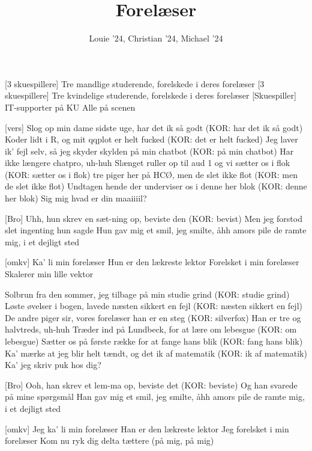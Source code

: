 \documentclass[a4paper,11pt]{article}
\title{Forelæser}
\author{Louie '24, Christian '24, Michael '24}
\begin{document}
\maketitle

\begin{roles}
[3 skuespillere] Tre mandlige studerende, forelskede i deres forelæser
[3 skuespillere] Tre kvindelige studerende, forelskede i deres forelæser
[Skuespiller] IT-supporter på KU
 Alle på scenen
\end{roles}


\begin{song}
  [vers] Slog op min dame sidste uge, har det ik så godt (KOR: har det ik så godt)
  Koder lidt i R, og mit qqplot er helt fucked (KOR: det er helt fucked)
  Jeg laver ik' fejl selv, så jeg skyder skylden på min chatbot (KOR: på min chatbot)
  Har ikke længere chatpro, uh-huh 
  Slænget ruller op til aud 1 og vi sætter os i flok (KOR: sætter os i flok)
  tre piger her på HCØ, men de slet ikke flot (KOR: men de slet ikke flot)
  Undtagen hende der underviser os i denne her blok (KOR: denne her blok)
  Sig mig hvad er din maaiiiil?

[Bro] Uhh, hun skrev en sæt-ning op, beviste den (KOR: bevist)
  Men jeg forstod slet ingenting hun sagde 
  Hun gav mig et smil, jeg smilte, åhh amors pile
  de ramte mig, i et dejligt sted

  [omkv] Ka' li min forelæser
  Hun er den lækreste lektor
  Forelsket i min forelæser
  Skalerer min lille vektor

   Solbrun fra den sommer, jeg tilbage på min studie grind (KOR: studie grind)
  Løste øvelser i bogen, lavede næsten sikkert en fejl (KOR: næsten sikkert en fejl)
  De andre piger sir, vores forelæser han er en steg (KOR: silverfox)
  Han er tre og halvtreds, uh-huh 
  Træder ind på Lundbeck, for at lære om lebesgue (KOR: om lebesgue)
  Sætter os på første række for at fange hans blik (KOR: fang hans blik)
  Ka' mærke at jeg blir helt tændt, og det ik af matematik (KOR: ik af matematik)
  Ka' jeg skriv puk hos dig?

[Bro] Ooh, han skrev et lem-ma op, beviste det (KOR: beviste)
  Og han svarede på mine spørgsmål
  Han gav mig et smil, jeg smilte, åhh amors pile
  de ramte mig, i et dejligt sted

  [omkv] Jeg ka' li min forelæser
  Han er den lækreste lektor
  Jeg forelsket i min forelæser
  Kom nu ryk dig delta tættere (på mig, på mig)


\end{song}
\end{document}

